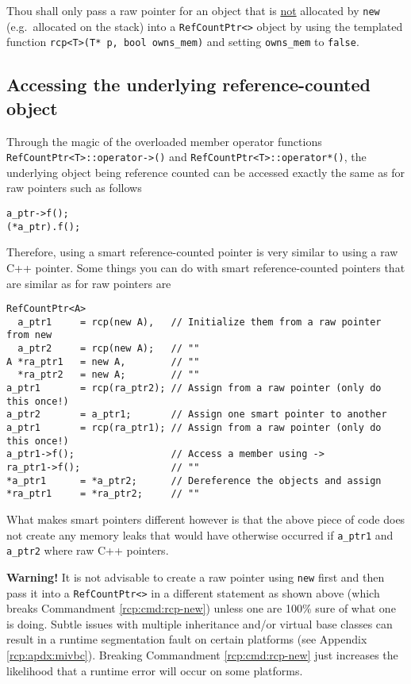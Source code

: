 \begin{commandment}
Thou shall only pass a raw pointer for an object that is
\underline{not} allocated by {}\texttt{new} (e.g.~allocated on the stack) into a
{}\texttt{RefCountPtr<>} object by using the templated function
{}\texttt{rcp<T>(T* p, bool owns\_mem)} and setting {}\texttt{owns\_mem} to
{}\texttt{false}.
\end{commandment}

%
\subsection{Accessing the underlying reference-counted object}
%

Through the magic of the overloaded member operator functions
{}\texttt{RefCountPtr<T>::operator->()} and
{}\texttt{RefCountPtr<T>::operator*()}, the underlying object being reference
counted can be accessed exactly the same as for raw pointers such as
follows

{\scriptsize\begin{verbatim}
a_ptr->f();
(*a_ptr).f();
\end{verbatim}}

Therefore, using a smart reference-counted pointer is very similar to
using a raw C++ pointer.  Some things you can do with smart
reference-counted pointers that are similar as for raw pointers are

{\scriptsize\begin{verbatim}
RefCountPtr<A>
  a_ptr1     = rcp(new A),   // Initialize them from a raw pointer from new
  a_ptr2     = rcp(new A);   // ""
A *ra_ptr1   = new A,        // ""
  *ra_ptr2   = new A;        // ""
a_ptr1       = rcp(ra_ptr2); // Assign from a raw pointer (only do this once!)
a_ptr2       = a_ptr1;       // Assign one smart pointer to another
a_ptr1       = rcp(ra_ptr1); // Assign from a raw pointer (only do this once!)
a_ptr1->f();                 // Access a member using ->
ra_ptr1->f();                // ""
*a_ptr1      = *a_ptr2;      // Dereference the objects and assign
*ra_ptr1     = *ra_ptr2;     // "" 
\end{verbatim}}

What makes smart pointers different however is that the above piece of code
does not create any memory leaks that would have otherwise occurred
if {}\texttt{a\_ptr1} and {}\texttt{a\_ptr2} where raw C++ pointers.

{}\textbf{Warning!} It is not advisable to create a raw pointer using
{}\texttt{new} first and then pass it into a {}\texttt{RefCountPtr<>} in a
different statement as shown above (which breaks Commandment
{}\ref{rcp:cmd:rcp-new}) unless one are 100\% sure of what one is doing.
Subtle issues with multiple inheritance and/or virtual base classes
can result in a runtime segmentation fault on certain platforms (see
Appendix {}\ref{rcp:apdx:mivbc}).  Breaking Commandment
{}\ref{rcp:cmd:rcp-new} just increases the likelihood that a runtime
error will occur on some platforms.


